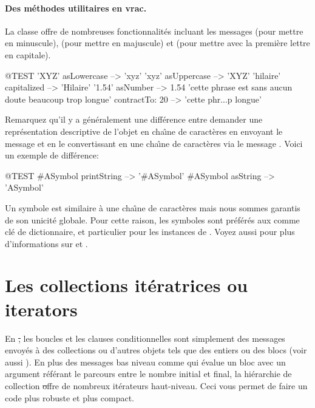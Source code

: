 \documentclass[a4paper,10pt,twoside]{book}
\begin{document}
\paragraph{Des m\'ethodes utilitaires en vrac.}
La classe  offre de nombreuses fonctionnalit\'es incluant les 
messages  (pour mettre en minuscule),  (pour mettre en majuscule) et  (pour mettre avec la premi\`ere lettre en capitale). 

\begin{code}{@TEST}
'XYZ' asLowercase --> 'xyz'
'xyz' asUppercase   --> 'XYZ'
'hilaire' capitalized   --> 'Hilaire'
'1.54' asNumber      --> 1.54
'cette phrase est sans aucun doute beaucoup trop longue' contractTo: 20 -->  'cette phr...p longue'
\end{code}

Remarquez qu'il y a g\'en\'eralement une diff\'erence entre demander une
repr\'esentation descriptive de l'objet en cha\^{\i}ne de caract\`eres
en envoyant le message
 et en le convertissant en une cha\^{\i}ne de caract\`eres via le message .
Voici un exemple de diff\'erence:

\begin{code}{@TEST}
#ASymbol printString --> '#ASymbol'
#ASymbol asString    --> 'ASymbol'
\end{code}

Un symbole  est similaire \`a une cha\^{\i}ne de caract\`eres
mais nous sommes garantis de son unicit\'e globale. Pour cette raison,
les symboles sont pr\'ef\'er\'es aux  comme cl\'e de dictionnaire,
et particulier pour les instances de 
.
Voyez aussi  pour plus d'informations sur  et .

\section{Les collections it\'eratrices ou iterators}
\label{sec:iterators}

En \st, les boucles et les clauses conditionnelles sont simplement
des messages envoy\'es \`a des collections ou d'autres objets
tels que des entiers ou des blocs (voir aussi ).
En plus des messages bas niveau comme 
  qui \'evalue un bloc avec un argument r\'ef\'erant le
parcours entre le nombre initial et final,
la hi\'erarchie de collection \st offre de nombreux it\'erateurs haut-niveau.
Ceci vous permet de faire un code plus robuste et plus compact.
\end{document}
